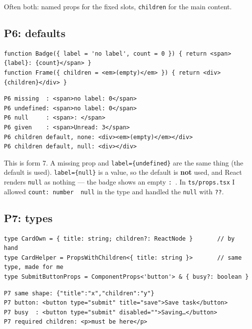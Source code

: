\documentclass[
  10pt,
]{article}
\begin{document}
Often both: named props for the fixed slots, \texttt{children} for the
main content.

\hypertarget{p6-defaults}{%
\subsection{P6: defaults}\label{p6-defaults}}

\begin{verbatim}
function Badge({ label = 'no label', count = 0 }) { return <span>{label}: {count}</span> }
function Frame({ children = <em>(empty)</em> }) { return <div>{children}</div> }
\end{verbatim}

\begin{verbatim}
P6 missing  : <span>no label: 0</span>
P6 undefined: <span>no label: 0</span>
P6 null     : <span>: </span>
P6 given    : <span>Unread: 3</span>
P6 children default, none: <div><em>(empty)</em></div>
P6 children default, null: <div></div>
\end{verbatim}

This is form 7. A missing prop and \texttt{label=\{undefined\}} are the
same thing (the default is used). \texttt{label=\{null\}} is a value, so
the default is \textbf{not} used, and React renders \texttt{null} as
nothing --- the badge shows an empty \texttt{:\ }. In
\texttt{ts/\allowbreak{}props.\allowbreak{}tsx} I allowed
\texttt{count:\ number\ \textbar{}\ null} in the type and handled the
\texttt{null} with \texttt{??}.

\hypertarget{p7-types}{%
\subsection{P7: types}\label{p7-types}}

\begin{verbatim}
type CardOwn = { title: string; children?: ReactNode }       // by hand
type CardHelper = PropsWithChildren<{ title: string }>       // same type, made for me
type SubmitButtonProps = ComponentProps<'button'> & { busy?: boolean }
\end{verbatim}

\begin{verbatim}
P7 same shape: {"title":"x","children":"y"}
P7 button: <button type="submit" title="save">Save task</button>
P7 busy  : <button type="submit" disabled="">Saving…</button>
P7 required children: <p>must be here</p>
\end{verbatim}
\end{document}
